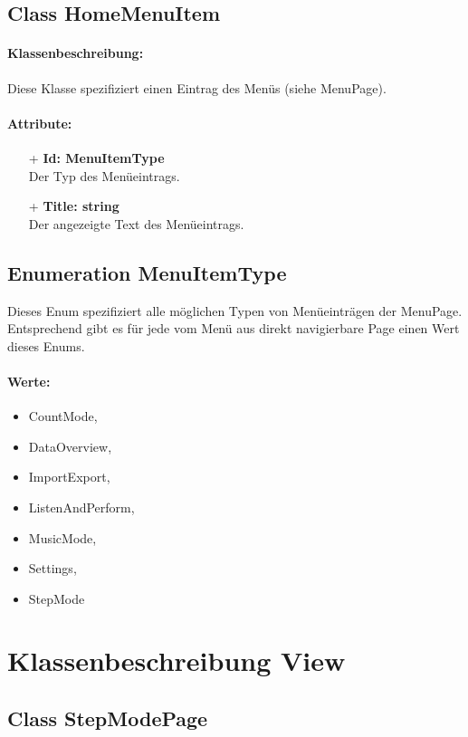 \documentclass[a4paper,12pt]{article}
\begin{document}
\subsection{Class HomeMenuItem}
	\paragraph{Klassenbeschreibung:}
	Diese Klasse spezifiziert einen Eintrag des Menüs (siehe MenuPage). 
	\paragraph{Attribute:}
	\begin{itemize}
		\item [+] \textbf{Id: MenuItemType}\\ Der Typ des Menüeintrags.
		\item [+] \textbf{Title: string}\\ Der angezeigte Text des Menüeintrags.
	\end{itemize}
\subsection{Enumeration MenuItemType}
	Dieses Enum spezifiziert alle möglichen Typen von Menüeinträgen der MenuPage. Entsprechend gibt es für jede vom Menü aus direkt navigierbare Page einen Wert dieses Enums.
	\paragraph{Werte:}
	\begin{itemize}
        \item CountMode,
        \item DataOverview,
        \item ImportExport,
        \item ListenAndPerform,
        \item MusicMode,
        \item Settings,
        \item StepMode
	\end{itemize}
\section{Klassenbeschreibung View}


\subsection{Class StepModePage}
\end{document}
